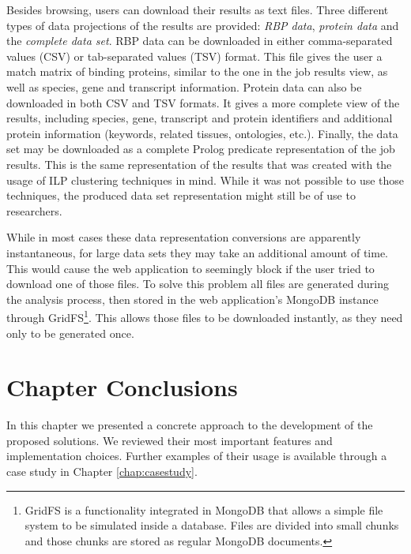 Besides browsing, users can download their results as text files. Three
different types of data projections of the results are provided: \emph{RBP
data}, \emph{protein data} and the \emph{complete data set}. RBP data can be
downloaded in either comma-separated values (CSV) or tab-separated values (TSV)
format. This file gives the user a match matrix of binding proteins, similar to
the one in the job results view, as well as species, gene and transcript
information. Protein data can also be downloaded in both CSV and TSV formats. It
gives a more complete view of the results, including species, gene, transcript
and protein identifiers and additional protein information (keywords, related
tissues, ontologies, etc.). Finally, the data set may be downloaded as a
complete Prolog predicate representation of the job results. This is the same
representation of the results that was created with the usage of ILP clustering
techniques in mind. While it was not possible to use those techniques, the
produced data set representation might still be of use to researchers.

While in most cases these data representation conversions are apparently
instantaneous, for large data sets they may take an additional amount of time.
This would cause the web application to seemingly block if the user tried to
download one of those files. To solve this problem all files are generated
during the analysis process, then stored in the web application's MongoDB
instance through GridFS\footnote{GridFS is a functionality integrated in MongoDB
that allows a simple file system to be simulated inside a database. Files are
divided into small chunks and those chunks are stored as regular MongoDB
documents.}. This allows those files to be downloaded instantly, as they need
only to be generated once.



\section{Chapter Conclusions}


In this chapter we presented a concrete approach to the development of the
proposed solutions. We reviewed their most important features and implementation
choices. Further examples of their usage is available through a case study in
Chapter \ref{chap:casestudy}.
